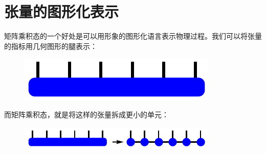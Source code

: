 \documentclass[UTF8]{ctexart}
\begin{document}
\section*{张量的图形化表示}
\noindent 矩阵乘积态的一个好处是可以用形象的图形化语言表示物理过程。我们可以将张量的指标用几何图形的腿表示：
\begin{figure}[H]
\begin{centering}
\includegraphics[width=0.4\linewidth]{include/p1}
\par\end{centering}
\end{figure}
\noindent 而矩阵乘积态，就是将这样的张量拆成更小的单元：
\begin{figure}[H]
\begin{centering}
\includegraphics[width=0.6\linewidth]{include/p2}
\par\end{centering}
\end{figure}
\end{document}
